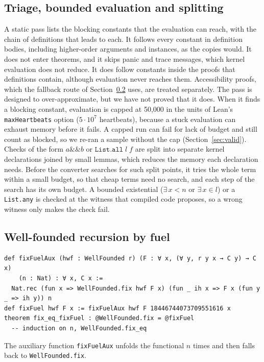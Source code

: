 \documentclass[11pt]{article}
\begin{document}
\subsection{Triage, bounded evaluation and splitting}\label{sec:triage}
A static pass lists the blocking constants that the evaluation can reach, with the chain of
definitions that leads to each. It follows every constant in definition bodies, including
higher-order arguments and instances, as the copies would. It does not enter theorems, and it skips panic
and trace messages, which kernel evaluation does not reduce. It does follow constants inside the proofs that
definitions contain, although evaluation never reaches them. Accessibility proofs, which the fallback route of
Section~\ref{sec:fuel} uses, are treated separately. The pass is designed
to over-approximate, but we have not proved that it does. When it finds a blocking constant,
evaluation is capped at 50,000 in the units of Lean's \texttt{maxHeartbeats} option
(\(5\cdot 10^{7}\) heartbeats), because a stuck evaluation can exhaust memory before it fails. A
capped run can fail for lack of budget and still count as blocked, so we re-ran a
sample without the cap (Section~\ref{sec:valid}). Checks of the form \(a \mathbin{\&\&} b\) or
\(\mathtt{List.all}\;l\;f\) are split into separate kernel declarations joined by small lemmas,
which reduces the memory each declaration needs. Before the converter searches for such split points, it tries
the whole term within a small budget, so that cheap terms need no search, and each step of the search has its
own budget. A bounded existential (\(\exists\, x < n\) or \(\exists\, x \in l\)) or a \texttt{List.any} is
checked at the witness that compiled code proposes, so a wrong witness only makes the check fail.

\subsection{Well-founded recursion by fuel}\label{sec:fuel}
\begin{lstlisting}
def fixFuelAux (hwf : WellFounded r) (F : ∀ x, (∀ y, r y x → C y) → C x)
    (n : Nat) : ∀ x, C x :=
  Nat.rec (fun x => WellFounded.fix hwf F x) (fun _ ih x => F x (fun y _ => ih y)) n
def fixFuel hwf F x := fixFuelAux hwf F 18446744073709551616 x
theorem fix_eq_fixFuel : @WellFounded.fix = @fixFuel
  -- induction on n, WellFounded.fix_eq
\end{lstlisting}
The auxiliary function \texttt{fixFuelAux} unfolds the functional \(n\) times and then falls back to
\texttt{WellFounded.fix}.
\end{document}
